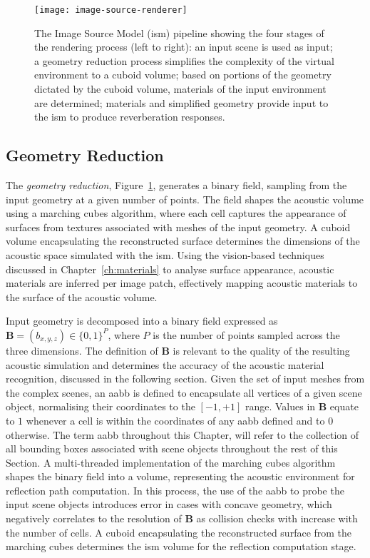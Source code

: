 \begin{figure}[htb]
    \centering
    \texttt{[image: image-source-renderer]}
    \caption[Image-Source Model-based acoustic rendering pipeline]{The Image Source Model (\acrshort{ism}) pipeline showing the four stages of the rendering process (left to right): an input scene is used as input; a geometry reduction process simplifies the complexity of the virtual environment to a cuboid volume; based on portions of the geometry dictated by the cuboid volume, materials of the input environment are determined; materials and simplified geometry provide input to the \acrshort{ism} to produce reverberation responses.}\label{fig:image-source-pipeline}
\end{figure}

\subsection{Geometry Reduction}
The \emph{geometry reduction}, Figure~\ref{fig:image-source-pipeline}, generates a binary field, sampling from the input geometry at a given number of points. The field shapes the acoustic volume using a marching cubes algorithm, where each cell captures the appearance of surfaces from textures associated with meshes of the input geometry. A cuboid volume encapsulating the reconstructed surface determines the dimensions of the acoustic space simulated with the \acrshort{ism}. Using the vision-based techniques discussed in Chapter~\ref{ch:materials} to analyse surface appearance, acoustic materials are inferred per image patch, effectively mapping acoustic materials to the surface of the acoustic volume.\par
Input geometry is decomposed into a binary field expressed as $\mathbf{B} = (b_{x,y,z}) \in \{ 0, 1 \}^{P}$, where $P$ is the number of points sampled across the three dimensions. The definition of $\mathbf{B}$ is relevant to the quality of the resulting acoustic simulation and determines the accuracy of the acoustic material recognition, discussed in the following section. Given the set of input meshes from the complex scenes, an \acrfull{aabb} is defined to encapsulate all vertices of a given scene object, normalising their coordinates to the $[-1, +1]$ range. Values in $\mathbf{B}$ equate to $1$ whenever a cell is within the coordinates of any \acrshort{aabb} defined and to $0$ otherwise. The term \acrshort{aabb} throughout this Chapter, will refer to the collection of all bounding boxes associated with scene objects throughout the rest of this Section. A multi-threaded implementation of the marching cubes algorithm \citep{bourke1994polygonising, lengyel2019foundations} shapes the binary field into a volume, representing the acoustic environment for reflection path computation. In this process, the use of the \acrshort{aabb} to probe the input scene objects introduces error in cases with concave geometry, which negatively correlates to the resolution of $\mathbf{B}$ as collision checks with  increase with the number of cells. A cuboid encapsulating the reconstructed surface from the marching cubes determines the \acrshort{ism} volume for the reflection computation stage.\par

